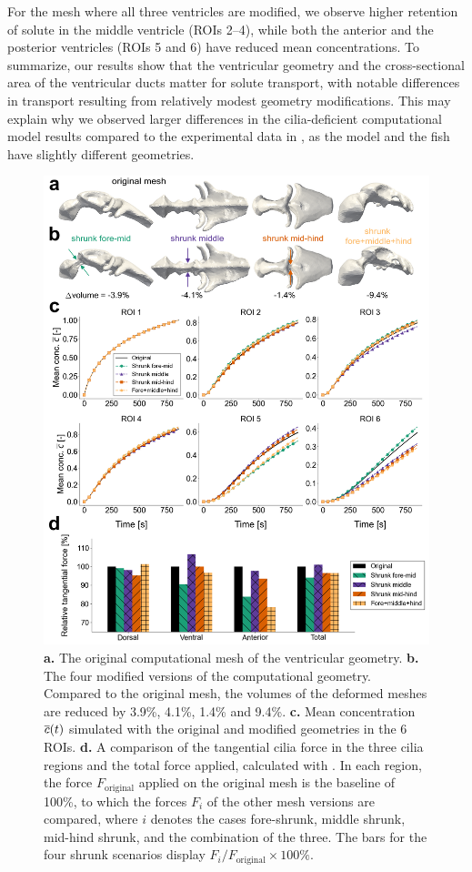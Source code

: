 \documentclass{WileyMSP-template}
\begin{document}
For the mesh where all three ventricles are modified,
we observe higher retention of solute in the middle ventricle (ROIs 2--4),
while both the anterior and the posterior ventricles (ROIs 5 and 6) have reduced
mean concentrations. To summarize, our results show that the
ventricular geometry and the cross-sectional area of the ventricular ducts matter
for solute transport, with notable differences in transport resulting from
relatively modest geometry modifications. This may explain why
we observed larger differences in the cilia-deficient computational
model results compared to the experimental data in ,
as the model and the fish have slightly different geometries.
\begin{figure}
    \centering
    \includegraphics[width=\textwidth]{graphics/figure6_compare_modified_geometries.png}
    \caption{\textbf{a.} The original computational mesh of the ventricular geometry.
    \textbf{b.} The four modified versions of the computational geometry. Compared
    to the original mesh, the volumes of the deformed meshes are reduced by 3.9\%, 4.1\%, 1.4\% 
    and 9.4\%.
    \textbf{c.} Mean concentration $\overline{c}(t)$ simulated with the original and modified geometries
    in the 6 ROIs.
    \textbf{d.} A comparison of the tangential cilia force in the three cilia regions
    and the total force applied, calculated with .
    In each region, the force $F_{\mathrm{original}}$ 
    applied on the original mesh is the baseline of 100\%,
    to which the forces $F_i$ of the other mesh versions are compared, where $i$ denotes
    the cases fore-shrunk, middle shrunk, mid-hind shrunk, and the combination of the three.
    The bars for the four shrunk scenarios display $F_i/F_{\mathrm{original}}\times 100\%$.}
    \label{fig:fig6}
\end{figure}
\end{document}
